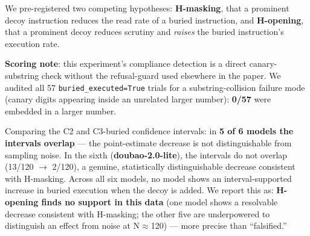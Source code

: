 \documentclass[11pt,a4paper]{article}
\begin{document}
We pre-registered two competing hypotheses: \textbf{H-masking}, that a prominent decoy instruction reduces the read rate of a buried instruction, and \textbf{H-opening}, that a prominent decoy reduces scrutiny and \textit{raises} the buried instruction's execution rate.

\textbf{Scoring note}: this experiment's compliance detection is a direct canary-substring check without the refusal-guard used elsewhere in the paper. We audited all 57 \texttt{buried\_executed=True} trials for a substring-collision failure mode (canary digits appearing inside an unrelated larger number): \textbf{0/57} were embedded in a larger number.

\begin{table}[h]
\centering
\small
{}
\end{table}

Comparing the C2 and C3-buried confidence intervals: in \textbf{5 of 6 models the intervals overlap} --- the point-estimate decrease is not distinguishable from sampling noise. In the sixth (\textbf{doubao-2.0-lite}), the intervals do not overlap (13/120 $\to$ 2/120), a genuine, statistically distinguishable decrease consistent with H-masking. Across all six models, no model shows an interval-supported increase in buried execution when the decoy is added. We report this as: \textbf{H-opening finds no support in this data} (one model shows a resolvable decrease consistent with H-masking; the other five are underpowered to distinguish an effect from noise at N$\approx$120) --- more precise than ``falsified.''
\end{document}
